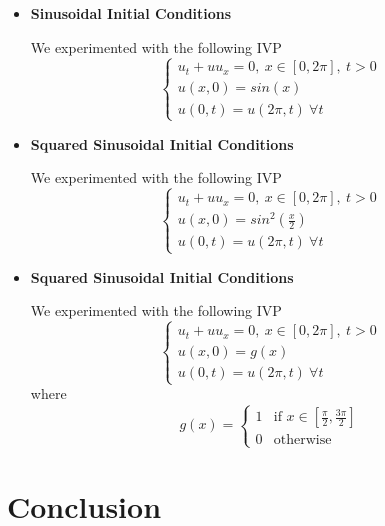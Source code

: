 \documentclass{myproject}
\begin{document}
\begin{itemize}
	\item \textbf{Sinusoidal Initial Conditions}
	
	We experimented with the following IVP
	\begin{equation}
	    \begin{cases}
	      	u_t + uu_x = 0, \: x \in [0, 2\pi], \: t>0 \\
			u(x,0) = sin(x) \\
			u(0,t) = u(2\pi,t) \: \forall t
	    \end{cases}
	\end{equation}
	
	\item \textbf{Squared Sinusoidal Initial Conditions}
	
	We experimented with the following IVP
	\begin{equation}
	    \begin{cases}
	      	u_t + uu_x = 0, \: x \in [0, 2\pi], \: t>0 \\
			u(x,0) = sin^2(\frac{x}{2}) \\
			u(0,t) = u(2\pi,t) \: \forall t
	    \end{cases}
	\end{equation}
	
	\item \textbf{Squared Sinusoidal Initial Conditions}
	
	We experimented with the following IVP
	\begin{equation}
	    \begin{cases}
	      	u_t + uu_x = 0, \: x \in [0, 2\pi], \: t>0 \\
			u(x,0) = g(x) \\
			u(0,t) = u(2\pi,t) \: \forall t
	    \end{cases}
	\end{equation}
	where
	\begin{equation}
		g(x) = 
	    \begin{cases}
	      	1 & \text{if } x \in [\frac{\pi}{2}, \frac{3\pi}{2}] \\
			0 & \text{otherwise} 
	    \end{cases}
	\end{equation}
		
\end{itemize}

\section{Conclusion}
\end{document}
